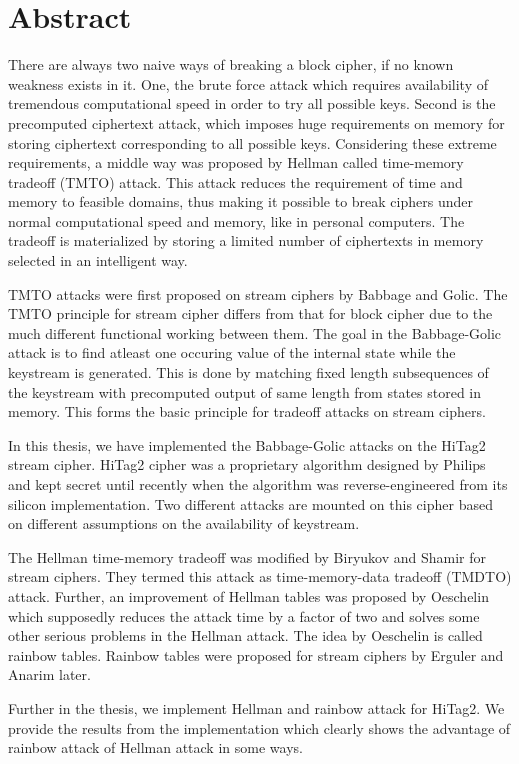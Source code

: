 

\chapter*{Abstract}

There are always two naive ways of breaking a block cipher, if no known weakness exists in it. One, the brute force attack which requires availability of tremendous computational speed in order to try all possible keys. Second is the precomputed ciphertext attack, which imposes huge requirements on memory for storing ciphertext corresponding to all possible keys. Considering these extreme requirements, a middle way was proposed by Hellman called time-memory tradeoff (TMTO) attack. This attack reduces the requirement of time and memory to feasible domains, thus making it possible to break ciphers under normal computational speed and memory, like in personal computers. The tradeoff is materialized by storing a limited number of ciphertexts in memory selected in an intelligent way. 

TMTO attacks were first proposed on stream ciphers by Babbage and Golic. The TMTO principle for stream cipher differs from that for block cipher due to the much different functional working between them. The goal in the Babbage-Golic attack is to find atleast one occuring value of the internal state while the keystream is generated. This is done by matching fixed length subsequences of the keystream with precomputed output of same length from states stored in memory. This forms the basic principle for tradeoff attacks on stream ciphers. 

In this thesis, we have implemented the Babbage-Golic attacks on the HiTag2 stream cipher. HiTag2 cipher was a proprietary algorithm designed by Philips and kept secret until recently when the algorithm was reverse-engineered from its silicon implementation. Two different attacks are mounted on this cipher based on different assumptions on the availability of keystream. 

The Hellman time-memory tradeoff was modified by Biryukov and Shamir for stream ciphers. They termed this attack as time-memory-data tradeoff (TMDTO) attack. Further, an improvement of Hellman tables was proposed by Oeschelin which supposedly reduces the attack time by a factor of two and solves some other serious problems in the Hellman attack. The idea by Oeschelin is called rainbow tables. Rainbow tables were proposed for stream ciphers by Erguler and Anarim later.

Further in the thesis, we implement Hellman and rainbow attack for HiTag2. We provide the results from the implementation which clearly shows the advantage of rainbow attack of Hellman attack in some ways. 